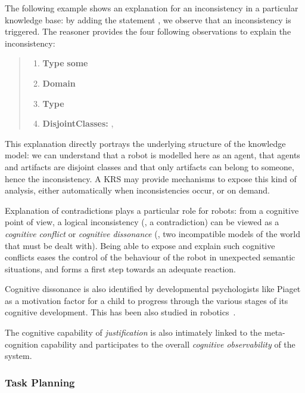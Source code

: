 The following example shows an explanation for an inconsistency in a particular
knowledge base: by adding the statement , we
observe that an inconsistency is triggered. The reasoner provides the four
following observations to explain the inconsistency:

\begin{quote}
\scriptsize
\begin{enumerate}
    \item {} {\bf Type}  {\bf some} 
    \item {} {\bf Domain} 
    \item {} {\bf Type} 
    \item {\bf DisjointClasses:} , 
\end{enumerate}
\normalsize
\end{quote}

This explanation directly portrays the underlying structure of the knowledge
model: we can understand that a robot is modelled here as an agent, that agents
and artifacts are disjoint classes and that only artifacts can belong to
someone, hence the inconsistency. A KRS may provide mechanisms to expose this
kind of analysis, either automatically when inconsistencies occur, or on
demand.

Explanation of contradictions plays a particular role for robots: from a
cognitive point of view, a logical inconsistency (\ie, a contradiction) can be
viewed as a \emph{cognitive conflict} or \emph{cognitive dissonance} (\ie, two
incompatible models of the world that must be dealt with). Being able to expose
and explain such cognitive conflicts eases the control of the behaviour of the
robot in unexpected semantic situations, and forms a first step towards an
adequate reaction.

Cognitive dissonance is also identified by developmental psychologists like
Piaget as a motivation factor for a child to progress through the various
stages of its cognitive development. This has been also studied in
robotics~\cite{Oudeyer2007}.


The cognitive capability of \emph{justification} is also intimately linked to
the meta-cognition capability and participates to the overall \emph{cognitive
observability} of the system.

\subsubsection{Task Planning}
\label{sect|planning}

